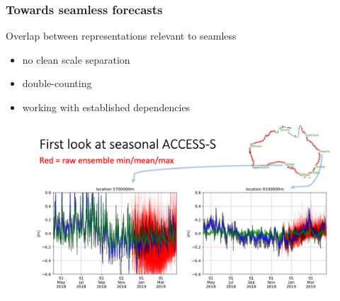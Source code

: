 \begin{frame}
\frametitle{Towards seamless forecasts}
Overlap between representations relevant to seamless
\begin{itemize}
    \item no clean scale separation
    \item double-counting
    \item working with established dependencies
\end{itemize}

    \begin{figure}      
    \includegraphics[width=\textwidth]{figures/plots/placeholder_accessS_timeseries.png}
    \end{figure}

\end{frame}